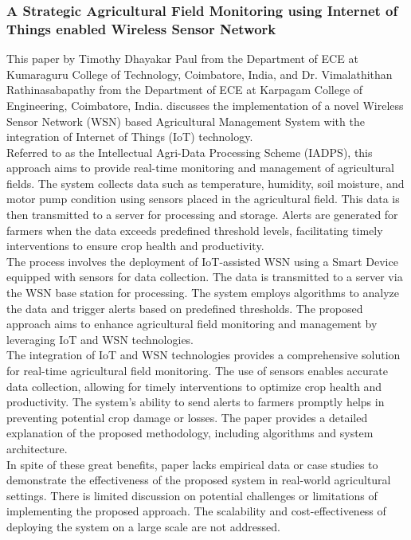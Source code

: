 \documentclass[12pt, a4paper]{article}
\begin{document}
\subsubsection{A Strategic Agricultural Field Monitoring using Internet of Things enabled Wireless Sensor Network}
This paper by Timothy Dhayakar Paul from the Department of ECE at Kumaraguru College of Technology, Coimbatore, India, and Dr. Vimalathithan Rathinasabapathy from the Department of ECE at Karpagam College of Engineering, Coimbatore, India. discusses the implementation of a novel Wireless Sensor Network (WSN) based Agricultural Management System with the integration of Internet of Things (IoT) technology.\\
Referred to as the Intellectual Agri-Data Processing Scheme (IADPS), this approach aims to provide real-time monitoring and management of agricultural fields. The system collects data such as temperature, humidity, soil moisture, and motor pump condition using sensors placed in the agricultural field. This data is then transmitted to a server for processing and storage. Alerts are generated for farmers when the data exceeds predefined threshold levels, facilitating timely interventions to ensure crop health and productivity.\\
The process involves the deployment of IoT-assisted WSN using a Smart Device equipped with sensors for data collection. The data is transmitted to a server via the WSN base station for processing. The system employs algorithms to analyze the data and trigger alerts based on predefined thresholds. The proposed approach aims to enhance agricultural field monitoring and management by leveraging IoT and WSN technologies.\\
The integration of IoT and WSN technologies provides a comprehensive solution for real-time agricultural field monitoring. The use of sensors enables accurate data collection, allowing for timely interventions to optimize crop health and productivity. The system's ability to send alerts to farmers promptly helps in preventing potential crop damage or losses. The paper provides a detailed explanation of the proposed methodology, including algorithms and system architecture.\\
In spite of these great benefits, paper lacks empirical data or case studies to demonstrate the effectiveness of the proposed system in real-world agricultural settings. There is limited discussion on potential challenges or limitations of implementing the proposed approach. The scalability and cost-effectiveness of deploying the system on a large scale are not addressed. 
\end{document}
